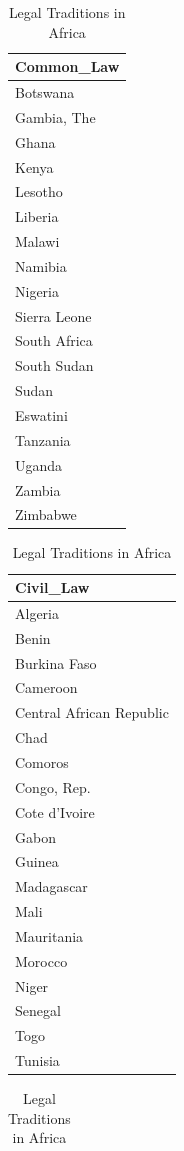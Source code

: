 \documentclass[a4paper, nobind]{templates/ociamthesis}
\begin{document}
\begin{table}
\caption{\label{tab:unnamed-chunk-48}Legal Traditions in Africa}

\centering
\begin{tabular}[t]{l}
\toprule
Common\_Law\\
\midrule
Botswana\\
Gambia, The\\
Ghana\\
Kenya\\
Lesotho\\
\addlinespace
Liberia\\
Malawi\\
Namibia\\
Nigeria\\
Sierra Leone\\
\addlinespace
South Africa\\
South Sudan\\
Sudan\\
Eswatini\\
Tanzania\\
\addlinespace
Uganda\\
Zambia\\
Zimbabwe\\
\bottomrule
\end{tabular}
\centering
\begin{tabular}[t]{l}
\toprule
Civil\_Law\\
\midrule
Algeria\\
Benin\\
Burkina Faso\\
Cameroon\\
Central African Republic\\
\addlinespace
Chad\\
Comoros\\
Congo, Rep.\\
Cote d'Ivoire\\
Gabon\\
\addlinespace
Guinea\\
Madagascar\\
Mali\\
Mauritania\\
Morocco\\
\addlinespace
Niger\\
Senegal\\
Togo\\
Tunisia\\
\bottomrule
\end{tabular}
\centering
\begin{tabular}[t]{l}

\end{tabular}
\end{table}
\end{document}

